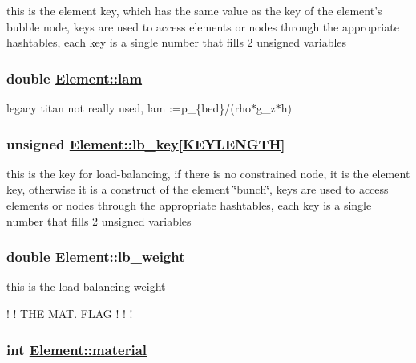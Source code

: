 this is the element key, which has the same value as the key of the element's bubble node, keys are used to access elements or nodes through the appropriate hashtables, each key is a single number that fills 2 unsigned variables 

\hypertarget{classElement_r42}{
\subsubsection[lam]{\setlength{\rightskip}{0pt plus 5cm}double \hyperlink{classElement_r42}{Element::lam}}}
\label{classElement_r42}


legacy titan not really used, lam :=p\_\-\{bed\}/(rho$\ast$g\_\-z$\ast$h) 

\hypertarget{classElement_r5}{
\subsubsection[lb\_\-key]{\setlength{\rightskip}{0pt plus 5cm}unsigned \hyperlink{classElement_r5}{Element::lb\_\-key}\mbox{[}\hyperlink{constant_8h_a10}{KEYLENGTH}\mbox{]}}}
\label{classElement_r5}


this is the key for load-balancing, if there is no constrained node, it is the element key, otherwise it is a construct of the element \char`\"{}bunch\char`\"{}, keys are used to access elements or nodes through the appropriate hashtables, each key is a single number that fills 2 unsigned variables 

\hypertarget{classElement_r4}{
\subsubsection[lb\_\-weight]{\setlength{\rightskip}{0pt plus 5cm}double \hyperlink{classElement_r4}{Element::lb\_\-weight}}}
\label{classElement_r4}


this is the load-balancing weight 

! ! THE MAT. FLAG ! ! ! \hypertarget{classElement_r3}{
\subsubsection[material]{\setlength{\rightskip}{0pt plus 5cm}int \hyperlink{classElement_r3}{Element::material}}}
\label{classElement_r3}


